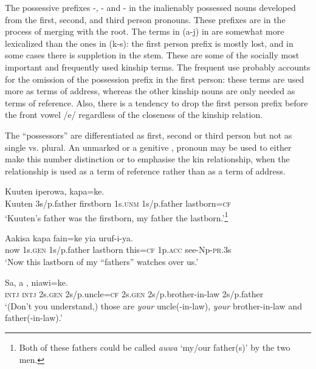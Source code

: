 The possessive prefixes -, - and - in the inalienably possessed nouns developed from the first, second, and third person pronouns. These prefixes are in the process of merging with the root. The terms in (a-j) in  are somewhat more lexicalized than the ones in (k-s): the first person prefix is mostly lost, and in some cases there is suppletion in the stem. These are some of the socially most important and frequently used kinship terms. The frequent use probably accounts for the omission of the possession prefix in the first person: these terms are used more as terms of address, whereas the other kinship nouns are only needed as terms of reference. Also, there is a tendency to drop the first person prefix before the front vowel /e/ regardless of the closeness of the kinship relation.

The ``possessors'' are differentiated as first, second or third person but not as single vs. plural. An unmarked  or a genitive ,  pronoun may be used to either make this number distinction or to emphasise the kin relationship, when the relationship is used as a term of reference rather than as a term of address.

\ea%
\label{ex:3:x1311}
\gll Kuuten  iperowa,   kapa=ke. \\
Kuuten 3s/p.father firstborn 1s.\textsc{unm} 1s/p.father lastborn=\textsc{cf}\\
\glt`Kuuten's father was the firstborn, my father the lastborn.'\footnote{Both of these fathers could be called \textit{auwa} `my/our father(s)' by the two men.}
\z

\ea%
\label{ex:3:x28}
\gll Aakisa    kapa fain=ke yia uruf-i-ya. \\
now 1s.\textsc{gen} 1s/p.father lastborn this=\textsc{cf} 1p.\textsc{acc} see-Np-\textsc{pr}.3s\\
\glt`Now this lastborn of my ``fathers'' watches over us.'
\z

\ea%
\label{ex:3:x1312}
\gll Sa, a  ,   niawi=ke.\\
\textsc{intj} \textsc{intj} 2s.\textsc{gen} 2s/p.uncle=\textsc{cf} 2s.\textsc{gen} 2s/p.brother-in-law 2s/p.father\\
\glt`(Don't you understand,) those are \textit{your} uncle(-in-law), \textit{your} brother-in-law and father(-in-law).'
\z

